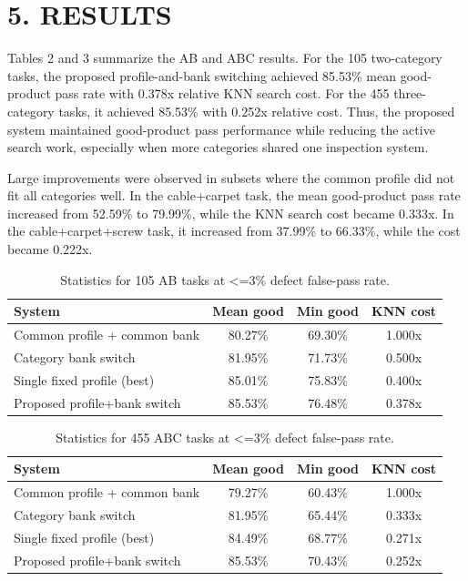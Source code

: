\documentclass[a4paper,twocolumn,10pt]{article}
\begin{document}
\section*{5. RESULTS}
Tables 2 and 3 summarize the AB and ABC results. For the 105 two-category tasks, the proposed profile-and-bank switching achieved 85.53\% mean good-product pass rate with 0.378x relative KNN search cost. For the 455 three-category tasks, it achieved 85.53\% with 0.252x relative cost. Thus, the proposed system maintained good-product pass performance while reducing the active search work, especially when more categories shared one inspection system.

Large improvements were observed in subsets where the common profile did not fit all categories well. In the cable+carpet task, the mean good-product pass rate increased from 52.59\% to 79.99\%, while the KNN search cost became 0.333x. In the cable+carpet+screw task, it increased from 37.99\% to 66.33\%, while the cost became 0.222x.

\begin{table}[h]\centering\small
\caption{Statistics for 105 AB tasks at <=3\% defect false-pass rate.}
\begin{tabular}{lccc}\toprule System & Mean good & Min good & KNN cost\\\midrule
Common profile + common bank & 80.27\% & 69.30\% & 1.000x\\
Category bank switch & 81.95\% & 71.73\% & 0.500x\\
Single fixed profile (best) & 85.01\% & 75.83\% & 0.400x\\
Proposed profile+bank switch & 85.53\% & 76.48\% & 0.378x\\
\bottomrule\end{tabular}\end{table}
\begin{table}[h]\centering\small
\caption{Statistics for 455 ABC tasks at <=3\% defect false-pass rate.}
\begin{tabular}{lccc}\toprule System & Mean good & Min good & KNN cost\\\midrule
Common profile + common bank & 79.27\% & 60.43\% & 1.000x\\
Category bank switch & 81.95\% & 65.44\% & 0.333x\\
Single fixed profile (best) & 84.49\% & 68.77\% & 0.271x\\
Proposed profile+bank switch & 85.53\% & 70.43\% & 0.252x\\
\bottomrule\end{tabular}\end{table}
\end{document}
